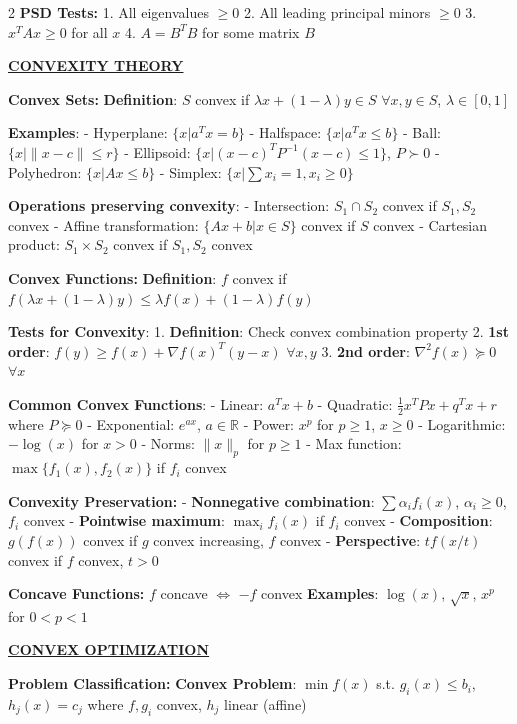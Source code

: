 \documentclass[8pt,a4paper,landscape]{article}
\newcommand{\mysection}[1]{\textbf{\underline{#1}}}
\newcommand{\mysubsection}[1]{\textbf{#1:}}
\begin{document}
\begin{multicols}{2}
\mysubsection{PSD Tests}
1. All eigenvalues $\geq 0$
2. All leading principal minors $\geq 0$
3. $x^TAx \geq 0$ for all $x$
4. $A = B^TB$ for some matrix $B$

\mysection{CONVEXITY THEORY}

\mysubsection{Convex Sets}
\textbf{Definition}: $S$ convex if $\lambda x + (1-\lambda)y \in S$ $\forall x,y \in S$, $\lambda \in [0,1]$

\textbf{Examples}:
- Hyperplane: $\{x | a^Tx = b\}$
- Halfspace: $\{x | a^Tx \leq b\}$
- Ball: $\{x | \|x-c\| \leq r\}$
- Ellipsoid: $\{x | (x-c)^TP^{-1}(x-c) \leq 1\}$, $P \succ 0$
- Polyhedron: $\{x | Ax \leq b\}$
- Simplex: $\{x | \sum x_i = 1, x_i \geq 0\}$

\textbf{Operations preserving convexity}:
- Intersection: $S_1 \cap S_2$ convex if $S_1, S_2$ convex
- Affine transformation: $\{Ax + b | x \in S\}$ convex if $S$ convex
- Cartesian product: $S_1 \times S_2$ convex if $S_1, S_2$ convex

\mysubsection{Convex Functions}
\textbf{Definition}: $f$ convex if $f(\lambda x + (1-\lambda)y) \leq \lambda f(x) + (1-\lambda)f(y)$

\textbf{Tests for Convexity}:
1. \textbf{Definition}: Check convex combination property
2. \textbf{1st order}: $f(y) \geq f(x) + \nabla f(x)^T(y-x)$ $\forall x,y$
3. \textbf{2nd order}: $\nabla^2 f(x) \succeq 0$ $\forall x$

\textbf{Common Convex Functions}:
- Linear: $a^Tx + b$
- Quadratic: $\frac{1}{2}x^TPx + q^Tx + r$ where $P \succeq 0$
- Exponential: $e^{ax}$, $a \in \mathbb{R}$
- Power: $x^p$ for $p \geq 1$, $x \geq 0$
- Logarithmic: $-\log(x)$ for $x > 0$
- Norms: $\|x\|_p$ for $p \geq 1$
- Max function: $\max\{f_1(x), f_2(x)\}$ if $f_i$ convex

\columnbreak

\mysubsection{Convexity Preservation}
- \textbf{Nonnegative combination}: $\sum \alpha_i f_i(x)$, $\alpha_i \geq 0$, $f_i$ convex
- \textbf{Pointwise maximum}: $\max_i f_i(x)$ if $f_i$ convex
- \textbf{Composition}: $g(f(x))$ convex if $g$ convex increasing, $f$ convex
- \textbf{Perspective}: $tf(x/t)$ convex if $f$ convex, $t > 0$

\mysubsection{Concave Functions}
$f$ concave $\Leftrightarrow$ $-f$ convex
\textbf{Examples}: $\log(x)$, $\sqrt{x}$, $x^p$ for $0 < p < 1$

\mysection{CONVEX OPTIMIZATION}

\mysubsection{Problem Classification}
\textbf{Convex Problem}: $\min f(x)$ s.t. $g_i(x) \leq b_i$, $h_j(x) = c_j$
where $f, g_i$ convex, $h_j$ linear (affine)


\end{multicols}
\end{document}

